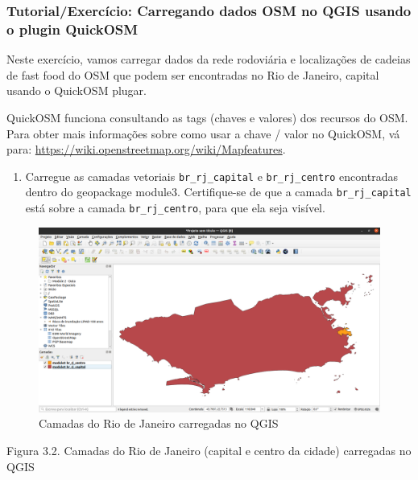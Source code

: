 \documentclass[
]{krantz}
\providecommand{\tightlist}{%
  \setlength{\itemsep}{0pt}\setlength{\parskip}{0pt}}
\begin{document}
\hypertarget{tutorialexercuxedcio-carregando-dados-osm-no-qgis-usando-o-plugin-quickosm}{%
\subsubsection{Tutorial/Exercício: Carregando dados OSM no QGIS usando o plugin QuickOSM}\label{tutorialexercuxedcio-carregando-dados-osm-no-qgis-usando-o-plugin-quickosm}}

Neste exercício, vamos carregar dados da rede rodoviária e localizações de cadeias de fast food do OSM que podem ser encontradas no Rio de Janeiro, capital usando o QuickOSM plugar.

QuickOSM funciona consultando as tags (chaves e valores) dos recursos do OSM. Para obter mais informações sobre como usar a chave / valor no QuickOSM, vá para: \href{https://wiki.openstreetmap.org/wiki/Mapfeatures.}{https://wiki.openstreetmap.org/wiki/Mapfeatures}.

\begin{enumerate}
\def\labelenumi{\arabic{enumi}.}
\tightlist
\item
  Carregue as camadas vetoriais \texttt{br\_rj\_capital} e \texttt{br\_rj\_centro} encontradas dentro do geopackage module3. Certifique-se de que a camada \texttt{br\_rj\_capital} está sobre a camada \texttt{br\_rj\_centro}, para que ela seja visível.
\end{enumerate}

\begin{figure}
\centering
\includegraphics{media/modulo3/quickosm-1.png}
\caption{Camadas do Rio de Janeiro carregadas no QGIS}
\end{figure}

Figura 3.2. Camadas do Rio de Janeiro (capital e centro da cidade) carregadas no QGIS
\end{document}
